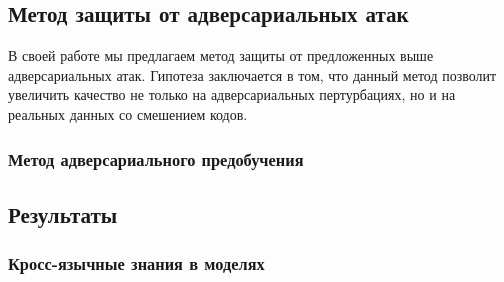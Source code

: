 
\subsection{Метод защиты от адверсариальных атак}
В своей работе мы предлагаем метод защиты от предложенных выше адверсариальных атак.
Гипотеза заключается в том, что данный метод позволит увеличить качество не только на адверсариальных пертурбациях, но и на реальных данных со смешением кодов.

\subsubsection{Метод адверсариального предобучения}

\subsection{Результаты}


\subsubsection{Кросс-язычные знания в моделях}


